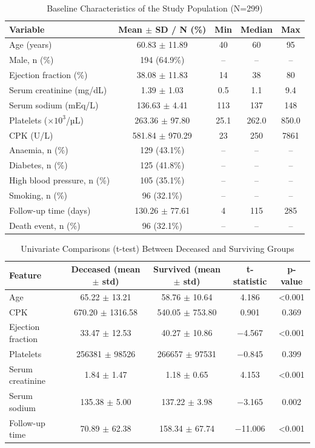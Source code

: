 \documentclass[12pt,a4paper]{article}
\begin{document}
\begin{table}[H]
\centering
\caption{Baseline Characteristics of the Study Population (N=299)}
\begin{tabular}{lcccc}
\toprule
\textbf{Variable} & \textbf{Mean $\pm$ SD / N (\%)} & \textbf{Min} & \textbf{Median} & \textbf{Max} \\
\midrule
Age (years) & 60.83 $\pm$ 11.89 & 40 & 60 & 95 \\
Male, n (\%) & 194 (64.9\%) & -- & -- & -- \\
Ejection fraction (\%) & 38.08 $\pm$ 11.83 & 14 & 38 & 80 \\
Serum creatinine (mg/dL) & 1.39 $\pm$ 1.03 & 0.5 & 1.1 & 9.4 \\
Serum sodium (mEq/L) & 136.63 $\pm$ 4.41 & 113 & 137 & 148 \\
Platelets ($\times 10^3$/µL) & 263.36 $\pm$ 97.80 & 25.1 & 262.0 & 850.0 \\
CPK (U/L) & 581.84 $\pm$ 970.29 & 23 & 250 & 7861 \\
Anaemia, n (\%) & 129 (43.1\%) & -- & -- & -- \\
Diabetes, n (\%) & 125 (41.8\%) & -- & -- & -- \\
High blood pressure, n (\%) & 105 (35.1\%) & -- & -- & -- \\
Smoking, n (\%) & 96 (32.1\%) & -- & -- & -- \\
Follow-up time (days) & 130.26 $\pm$ 77.61 & 4 & 115 & 285 \\
Death event, n (\%) & 96 (32.1\%) & -- & -- & -- \\
\bottomrule
\end{tabular}
\label{tab:baseline}
\end{table}

\begin{table}[H]
\centering
\caption{Univariate Comparisons (t-test) Between Deceased and Surviving Groups}
\begin{tabular}{lcccc}
\toprule
\textbf{Feature} & \textbf{Deceased (mean $\pm$ std)} & \textbf{Survived (mean $\pm$ std)} & \textbf{t-statistic} & \textbf{p-value} \\
\midrule
Age & 65.22 $\pm$ 13.21 & 58.76 $\pm$ 10.64 & 4.186 & <0.001 \\
CPK & 670.20 $\pm$ 1316.58 & 540.05 $\pm$ 753.80 & 0.901 & 0.369 \\
Ejection fraction & 33.47 $\pm$ 12.53 & 40.27 $\pm$ 10.86 & $-$4.567 & <0.001 \\
Platelets & 256381 $\pm$ 98526 & 266657 $\pm$ 97531 & $-$0.845 & 0.399 \\
Serum creatinine & 1.84 $\pm$ 1.47 & 1.18 $\pm$ 0.65 & 4.153 & <0.001 \\
Serum sodium & 135.38 $\pm$ 5.00 & 137.22 $\pm$ 3.98 & $-$3.165 & 0.002 \\
Follow-up time & 70.89 $\pm$ 62.38 & 158.34 $\pm$ 67.74 & $-$11.006 & <0.001 \\
\bottomrule
\end{tabular}
\label{tab:ttest}
\end{table}
\end{document}
